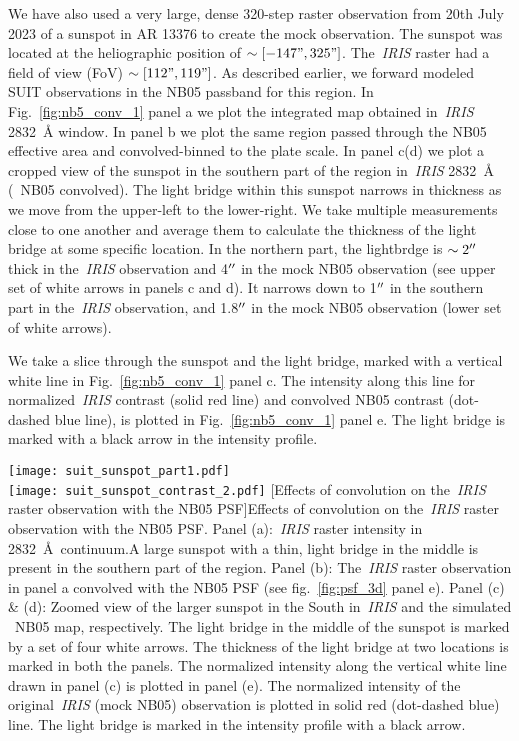 We have also used a very large, dense 320-step raster observation from 20th July 2023 of a sunspot in AR 13376 to create the mock observation. The sunspot was located at the heliographic position of $\sim [-147",325"]$. The~{\it IRIS} raster had a field of view (FoV) $\sim [112",119"]$. As described earlier, we forward modeled SUIT observations in the NB05 passband for this region. In Fig.~\ref{fig:nb5_conv_1} panel a we plot the integrated map obtained in~{\it IRIS} 2832~{\AA} window. In panel b we plot the same region passed through the NB05 effective area and convolved-binned to the {\suit} plate scale. In panel c(d) we plot a cropped view of the sunspot in the southern part of the region in~{\it IRIS} 2832~{\AA} ({\suit}~NB05 convolved). The light bridge within this sunspot narrows in thickness as we move from the upper-left to the lower-right. We take multiple measurements close to one another and average them to calculate the thickness of the light bridge at some specific location. In the northern part, the lightbrdge is $\sim 2\hbox{$^{\prime\prime}$}$ thick in the~{\it IRIS} observation and 4$\hbox{$^{\prime\prime}$}$ in the mock NB05 observation (see upper set of white arrows in panels c and d). It narrows down to 1$\hbox{$^{\prime\prime}$}$ in the southern part in the~{\it IRIS} observation, and 1.8$\hbox{$^{\prime\prime}$}$ in the mock NB05 observation (lower set of white arrows).

We take a slice through the sunspot and the light bridge, marked with a vertical white line in Fig.~\ref{fig:nb5_conv_1} panel c. The intensity along this line for normalized~{\it IRIS} contrast (solid red line) and convolved NB05 contrast (dot-dashed blue line), is plotted in Fig.~\ref{fig:nb5_conv_1} panel e. The light bridge is marked with a black arrow in the intensity profile.

\begingroup
    \centering
    \texttt{[image: suit\_sunspot\_part1.pdf]} \\
    \texttt{[image: suit\_sunspot\_contrast\_2.pdf]}
    [Effects of convolution on the~{\it IRIS} raster observation with the NB05 PSF]{Effects of convolution on the~{\it IRIS} raster observation with the NB05 PSF. Panel (a):~{\it IRIS} raster intensity in 2832~\AA\ continuum.A large sunspot with a thin, light bridge in the middle is present in the southern part of the region. Panel (b): The~{\it IRIS} raster observation in panel a convolved with the NB05 PSF (see fig.~\ref{fig:psf_3d} panel e). Panel (c) \& (d): Zoomed view of the larger sunspot in the South in~{\it IRIS} and the simulated \suit\ NB05 map, respectively. The light bridge in the middle of the sunspot is marked by a set of four white arrows. The thickness of the light bridge at two locations is marked in both the panels. The normalized intensity along the vertical  white line drawn in panel (c) is plotted in panel (e). The normalized intensity of the original~{\it IRIS} (mock NB05) observation is plotted in solid red (dot-dashed blue) line. The light bridge is marked in the intensity profile with a black arrow.}
    \label{fig:nb5_conv_1}
\endgroup

